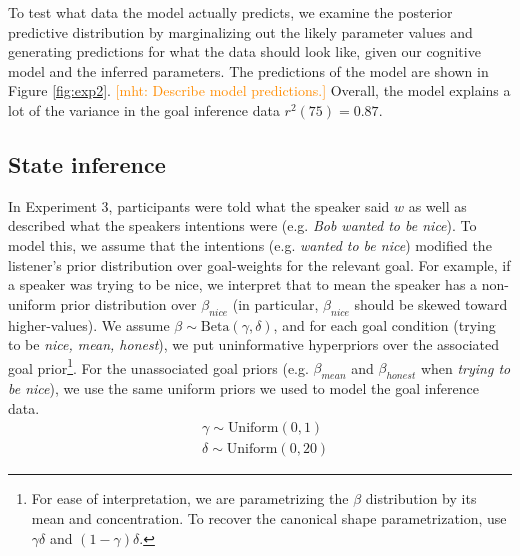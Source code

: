 \documentclass[10pt,letterpaper]{article}
\newcommand{\mht}[1]{\textcolor{DarkOrange}{[mht: #1]}}
\begin{document}

To test what data the model actually predicts, we examine the posterior predictive distribution by marginalizing out the likely parameter values and generating predictions for what the data should look like, given our cognitive model and the inferred parameters.
The predictions of the model are shown in Figure \ref{fig:exp2}.
\mht{Describe model predictions.}
Overall, the model explains a lot of the variance in the goal inference data $r^2(75) = 0.87$.

\subsection{State inference}

In Experiment 3, participants were told what the speaker said $w$ as well as described what the speakers intentions were (e.g. \emph{Bob wanted to be nice}). 
To model this, we assume that the intentions (e.g. \emph{wanted to be nice}) modified the listener's prior distribution over goal-weights for the relevant goal. For example, if a speaker was trying to be nice, we interpret that to mean the speaker has a non-uniform prior distribution over $\beta_{nice}$ (in particular, $\beta_{nice}$ should be skewed toward higher-values). 
We assume $\beta \sim \text{Beta}(\gamma, \delta)$, and for each goal condition (trying to be \emph{nice, mean, honest}), we put uninformative hyperpriors over the associated goal prior\footnote{For ease of interpretation, we are parametrizing the $\beta$ distribution by its mean and concentration. To recover the canonical shape parametrization, use $\gamma \delta$ and $(1-\gamma)\delta$.}.
For the unassociated goal priors (e.g. $\beta_{mean}$ and $\beta_{honest}$ when \emph{trying to be nice}), we use the same uniform priors we used to model the goal inference data.
%
\begin{eqnarray*}
& \gamma \sim  \text{Uniform}(0,1)\\
& \delta  \sim  \text{Uniform}(0, 20)
\end{eqnarray*}
\end{document}

